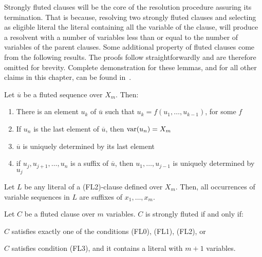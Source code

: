 Strongly fluted clauses will be the core of the resolution procedure assuring its termination.
That is because, resolving two strongly fluted clauses and selecting as eligible literal the literal containing all the variable of the clause, will produce a resolvent with a number of variables less than or equal to the number of variables of the parent clauses.
Some additional property of fluted clauses come from the following results.
The proofs follow straightforwardly and are therefore omitted for brevity. Complete demonstration for these lemmas, and for all other claims in this chapter, can be found in~\cite{hustadt2000resolution}.

\begin{lemma}\label{lem:fluted-sequence-properties}
  Let \(\overline{u}\) be a fluted sequence over \(X_m\). Then:
  \begin{enumerate}
    \item There is an element \(u_k\) of \(\overline{u}\) such that \(u_k = f(u_1,\ldots,u_{k-1})\), for some \(f\)
    \item If \(u_n\) is the last element of \(\overline{u}\), then \(\text{var} (u_n) = X_m\)
    \item \(\overline{u}\) is uniquely determined by its last element
    \item if \(u_j, u_{j+1}, \ldots, u_n\) is a suffix of \(\overline{u}\), then \(u_1, \ldots, u_{j-1}\) is uniquely determined by \(u_j\)
  \end{enumerate}
\end{lemma}

\begin{lemma}\label{lem:var-sequence-fl2}
  Let \(L\) be any literal of a (FL2)-clause defined over \(X_m\). Then, all occurrences of variable sequences in \(L\) are suffixes of \(x_1, \ldots, x_m\).
\end{lemma}

\begin{lemma}\label{lem:strongly-fluted-clauses}
  Let \(C\) be a fluted clause over \(m\) variables. \(C\) is strongly fluted if and only if:
  \begin{enumerate*}[label= (\roman*)]
    \item \(C\) satisfies exactly one of the conditions (FL0), (FL1), (FL2), or
    \item \(C\) satisfies condition (FL3), and it contains a literal with \(m+1\) variables.
  \end{enumerate*}
\end{lemma}

